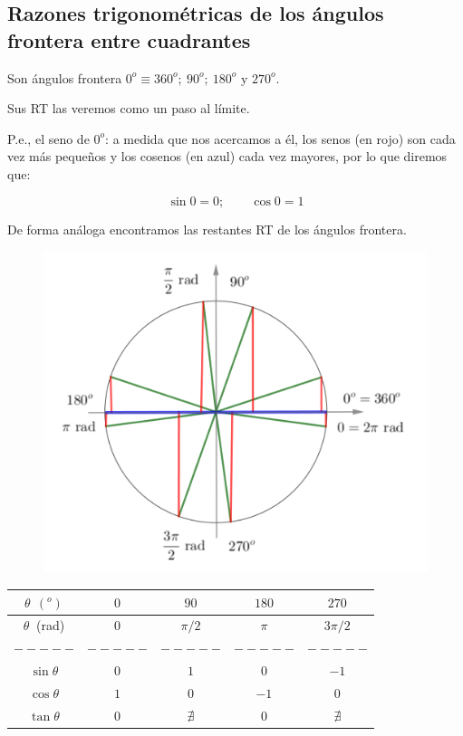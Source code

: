 \subsection{Razones trigonométricas de los ángulos frontera entre cuadrantes}
\vspace{0.5cm}


\begin{multicols}{2}

Son ángulos frontera $0^o\equiv 360^o;\ 90^o;\ 180^o \text{ y } 270^o$.

Sus RT las veremos como un paso al límite.

P.e., el seno de $0^o$: a medida que nos acercamos a él, los senos (en rojo) son cada vez más pequeños y los cosenos (en azul) cada vez mayores, por lo que diremos que:

$$\sin 0=0;\qquad \cos 0=1$$

De forma análoga encontramos las restantes RT de los ángulos frontera.
\begin{figure}[H]
	\centering
	\includegraphics[width=.5\textwidth]{img-rt/rt25.png}
\end{figure}	
\end{multicols}

\begin{table}[H]
\centering
\begin{tabular}{|c|c|c|c|c|}
\hline
$\theta \ \ (^o)$ & $\quad 0 \quad$ & $\quad 90 \quad$ & $\quad 180 \quad$ & $\quad 270 \quad $ \\ \hline
$\theta \ $ (rad) & $0$ & $\pi/2$ & $\pi$ & $3\pi/2$ \\ \hline $-----$&$-----$&$-----$&$-----$&  $-----$ \\ \hline
$\sin \theta$ & $0$ & $1$ & $0$ & $-1$ \\ \hline
$\cos \theta$ & $1$ & $0$ & $-1$ & $0$ \\ \hline
$\tan \theta$ & $0$ & $\nexists$ & $0$ & $\nexists$ \\ \hline
\end{tabular}
\end{table}






